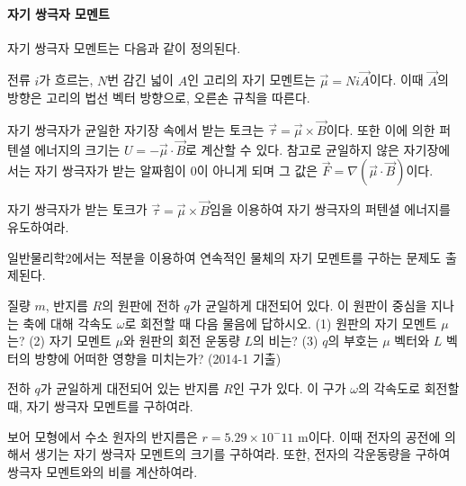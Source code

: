 \paragraph{자기 쌍극자 모멘트}
자기 쌍극자 모멘트는 다음과 같이 정의된다.
\begin{remark}
전류 $i$가 흐르는, $N$번 감긴 넓이 $A$인 고리의 자기 모멘트는 $\vec{\mu}=Ni\vec{A}$이다. 이때 $\vec{A}$의 방향은 고리의 법선 벡터 방향으로, 오른손 규칙을 따른다.
\end{remark}
자기 쌍극자가 균일한 자기장 속에서 받는 토크는 $\vec{\tau}=\vec{\mu}\times\vec{B}$이다. 또한 이에 의한 퍼텐셜 에너지의 크기는 $U=-\vec{\mu}\cdot\vec{B}$로 계산할 수 있다. 참고로 균일하지 않은 자기장에서는 자기 쌍극자가 받는 알짜힘이 0이 아니게 되며 그 값은 $\vec{F}=\nabla(\vec{\mu}\cdot\vec{B})$이다.
\begin{exercise}
자기 쌍극자가 받는 토크가 $\vec{\tau}=\vec{\mu}\times\vec{B}$임을 이용하여 자기 쌍극자의 퍼텐셜 에너지를 유도하여라.
\end{exercise}
일반물리학2에서는 적분을 이용하여 연속적인 물체의 자기 모멘트를 구하는 문제도 출제된다.
\begin{problem}
질량 $m$, 반지름 $R$의 원판에 전하 $q$가 균일하게 대전되어 있다. 이 원판이 중심을 지나는 축에 대해 각속도 $\omega$로 회전할 때 다음 물음에 답하시오. (1) 원판의 자기 모멘트 $\mu$는? (2) 자기 모멘트 $\mu$와 원판의 회전 운동량 $L$의 비는? (3) $q$의 부호는 $\mu$ 벡터와 $L$ 벡터의 방향에 어떠한 영향을 미치는가? (2014-1 기출)
\end{problem}
\begin{problem}
전하 $q$가 균일하게 대전되어 있는 반지름 $R$인 구가 있다. 이 구가 $\omega$의 각속도로 회전할 때, 자기 쌍극자 모멘트를 구하여라. 
\end{problem}
\begin{problem}
보어 모형에서 수소 원자의 반지름은 $r=5.29\times10^-11$ m이다. 이때 전자의 공전에 의해서 생기는 자기 쌍극자 모멘트의 크기를 구하여라. 또한, 전자의 각운동량을 구하여 쌍극자 모멘트와의 비를 계산하여라.
\end{problem}

